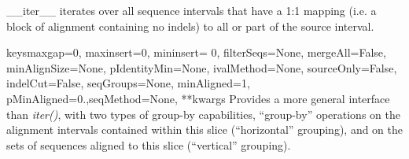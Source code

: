 \documentclass{howto}
\begin{document}
\begin{funcdesc}{__iter__}{}
  iterates over all sequence intervals that have
  a 1:1 mapping (i.e. a block of alignment containing no indels) to
  all or part of the source interval.
\end{funcdesc}


\begin{funcdesc}{keys}{maxgap=0, maxinsert=0, mininsert= 0, filterSeqs=None, mergeAll=False, minAlignSize=None, pIdentityMin=None, ivalMethod=None, sourceOnly=False, indelCut=False, seqGroups=None, minAligned=1, pMinAligned=0.,seqMethod=None, **kwargs}
  Provides a more general interface than {\em iter()}, with two types of 
  group-by capabilities, ``group-by'' operations on the alignment intervals
  contained within this slice (``horizontal'' grouping), 
  and on the sets of sequences aligned
  to this slice (``vertical'' grouping).


\end{funcdesc}
\end{document}
